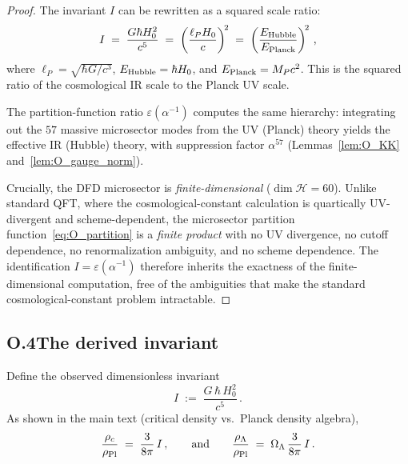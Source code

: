 \begin{proof}
The invariant $I$ can be rewritten as a squared scale ratio:
\begin{equation}
I \;=\; \frac{G\hbar H_0^2}{c^5}
  \;=\; \left(\frac{\ell_P H_0}{c}\right)^{\!2}
  \;=\; \left(\frac{E_{\rm Hubble}}{E_{\rm Planck}}\right)^{\!2}\,,
\end{equation}
where $\ell_P = \sqrt{\hbar G/c^3}$, $E_{\rm Hubble} = \hbar H_0$,
and $E_{\rm Planck} = M_P c^2$.
This is the squared ratio of the cosmological IR scale to the Planck UV scale.

The partition-function ratio $\varepsilon(\alpha^{-1})$ computes the same hierarchy:
integrating out the $57$ massive microsector modes from the UV (Planck) theory yields
the effective IR (Hubble) theory, with suppression factor $\alpha^{57}$
(Lemmas~\ref{lem:O_KK} and~\ref{lem:O_gauge_norm}).

Crucially, the DFD microsector is \emph{finite-dimensional} ($\dim\mathcal{H} = 60$).
Unlike standard QFT, where the cosmological-constant calculation is quartically UV-divergent
and scheme-dependent, the microsector partition function~\eqref{eq:O_partition}
is a \emph{finite product} with no UV divergence, no cutoff dependence, no renormalization
ambiguity, and no scheme dependence.
The identification $I = \varepsilon(\alpha^{-1})$ therefore inherits the exactness of the
finite-dimensional computation, free of the ambiguities that make the standard cosmological-constant
problem intractable.
\end{proof}

\subsection{O.4\quad The derived invariant}

Define the observed dimensionless invariant
\begin{equation}
I\;:=\;\frac{G\,\hbar\,H_0^2}{c^5}\,.
\end{equation}
As shown in the main text (critical density vs.\ Planck density algebra),
\begin{equation}
\frac{\rho_c}{\rho_{\rm Pl}}
\;=\;
\frac{3}{8\pi}\,I\,,
\qquad\text{and}\qquad
\frac{\rho_\Lambda}{\rho_{\rm Pl}}
\;=\;
\Omega_\Lambda\,\frac{3}{8\pi}\,I\,.
\label{eq:O_dictionary_rho}
\end{equation}

